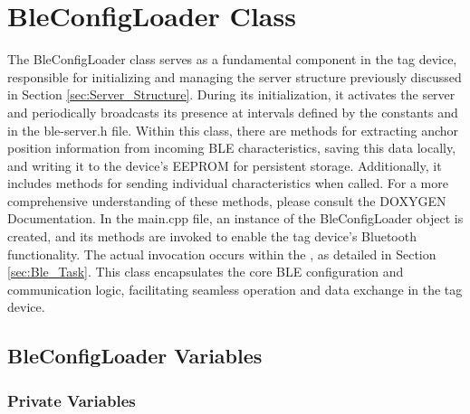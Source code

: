 \section{BleConfigLoader Class}
\label{sec:BleConfigLoader}
The BleConfigLoader class serves as a fundamental component in the tag device, responsible for initializing and managing the server structure previously discussed in Section \ref{sec:Server_Structure}. During its initialization, it activates the server and periodically broadcasts its presence at intervals defined by the constants  and  in the ble-server.h file.
\vspace{4pt}
\newline
Within this class, there are methods for extracting anchor position information from incoming BLE characteristics, saving this data locally, and writing it to the device's EEPROM for persistent storage. Additionally, it includes methods for sending individual characteristics when called. For a more comprehensive understanding of these methods, please consult the DOXYGEN Documentation.
\vspace{4pt}
\newline
In the main.cpp file, an instance of the BleConfigLoader object is created, and its methods are invoked to enable the tag device's Bluetooth functionality. The actual invocation occurs within the , as detailed in Section \ref{sec:Ble_Task}. This class encapsulates the core BLE configuration and communication logic, facilitating seamless operation and data exchange in the tag device.

\subsection{BleConfigLoader Variables}
\label{sub:BleConfigLoader_Variables}

\subsubsection{Private Variables}

